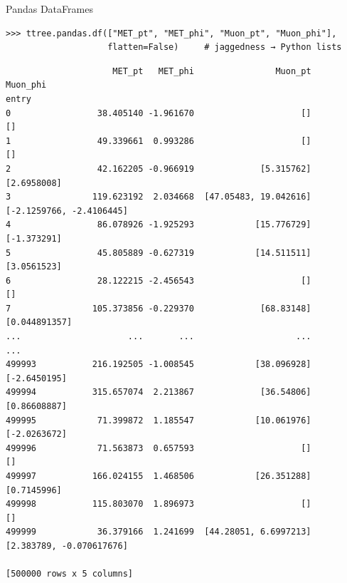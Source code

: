 \documentclass[aspectratio=169]{beamer}
\begin{document}
\begin{frame}[fragile]{Pandas DataFrames}
\small
\begin{verbatim}
>>> ttree.pandas.df(["MET_pt", "MET_phi", "Muon_pt", "Muon_phi"],
                    flatten=False)     # jaggedness → Python lists
\end{verbatim}
\scriptsize\color{darkblue}\vspace{-0.75\baselineskip}\begin{verbatim}
                     MET_pt   MET_phi                Muon_pt                 Muon_phi
entry                                                                                
0                 38.405140 -1.961670                     []                       []
1                 49.339661  0.993286                     []                       []
2                 42.162205 -0.966919             [5.315762]              [2.6958008]
3                119.623192  2.034668  [47.05483, 19.042616] [-2.1259766, -2.4106445]
4                 86.078926 -1.925293            [15.776729]              [-1.373291]
5                 45.805889 -0.627319            [14.511511]              [3.0561523]
6                 28.122215 -2.456543                     []                       []
7                105.373856 -0.229370             [68.83148]            [0.044891357]
...                     ...       ...                    ...                      ...
499993           216.192505 -1.008545            [38.096928]             [-2.6450195]
499994           315.657074  2.213867             [36.54806]             [0.86608887]
499995            71.399872  1.185547            [10.061976]             [-2.0263672]
499996            71.563873  0.657593                     []                       []
499997           166.024155  1.468506            [26.351288]              [0.7145996]
499998           115.803070  1.896973                     []                       []
499999            36.379166  1.241699  [44.28051, 6.6997213] [2.383789, -0.070617676]

[500000 rows x 5 columns]
\end{verbatim}
\end{frame}
\end{document}
